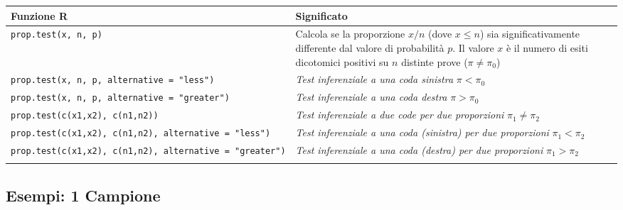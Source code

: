 \documentclass[
  ignorenonframetext,
  compress, aspectratio=149]{beamer}
\begin{document}
\begin{frame}{}
\label{section-12}
\small

\begin{longtable}[]{@{}
  >{\raggedright\arraybackslash}p{}
  >{\raggedright\arraybackslash}p{}@{}}
\toprule\noalign{}
\begin{minipage}[b]{\linewidth}\raggedright
\textbf{Funzione R}
\end{minipage} & \begin{minipage}[b]{\linewidth}\raggedright
\textbf{Significato}
\end{minipage} \\
\midrule\noalign{}
\endhead
\texttt{prop.test(x,\ n,\ p)} & Calcola se la proporzione \(x/n\) (dove
\(x \le n\)) sia significativamente differente dal valore di probabilità
\(p\). Il valore \(x\) è il numero di esiti dicotomici positivi su \(n\)
distinte prove (\(\pi \neq \pi_0\)) \\
\texttt{prop.test(x,\ n,\ p,\ alternative\ =\ "less")} & \emph{Test
inferenziale a una coda sinistra} \(\pi < \pi_0\) \\
\texttt{prop.test(x,\ n,\ p,\ alternative\ =\ "greater")} & \emph{Test
inferenziale a una coda destra} \(\pi > \pi_0\) \\
\texttt{prop.test(c(x1,x2),\ c(n1,n2))} & \emph{Test inferenziale a due
code per due proporzioni} \(\pi_1 \neq \pi_2\) \\
\texttt{prop.test(c(x1,x2),\ c(n1,n2),\ alternative\ =\ "less")} &
\emph{Test inferenziale a una coda (sinistra) per due proporzioni}
\(\pi_1 < \pi_2\) \\
\texttt{prop.test(c(x1,x2),\ c(n1,n2),\ alternative\ =\ "greater")} &
\emph{Test inferenziale a una coda (destra) per due proporzioni}
\(\pi_1 > \pi_2\) \\
\bottomrule\noalign{}
\end{longtable}
\end{frame}

\subsection{Esempi: 1 Campione}\label{esempi-1-campione}
\end{document}
